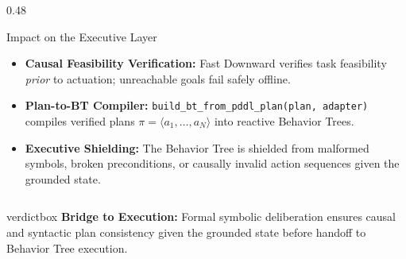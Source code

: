 \documentclass[10pt]{beamer}
\begin{document}
\begin{frame}[t]
\begin{columns}[T]
        \begin{column}{0.48\textwidth}
            \begin{block}{Impact on the Executive Layer}
                \begin{itemize}\scriptsize
                    \setlength\itemsep{0.22em}
                    \item \textbf{Causal Feasibility Verification:}
                    \newline Fast Downward verifies task feasibility \textit{prior} to actuation; unreachable goals fail safely offline.
                    \item \textbf{Plan-to-BT Compiler:}
                    \newline \texttt{build\_bt\_from\_pddl\_plan(plan, adapter)} compiles verified plans $\pi = \langle a_1, \dots, a_N \rangle$ into reactive Behavior Trees.
                    \item \textbf{Executive Shielding:}
                    \newline The Behavior Tree is shielded from malformed symbols, broken preconditions, or causally invalid action sequences given the grounded state.
                \end{itemize}
            \end{block}
        \end{column}
    \end{columns}

    \vspace{0.06cm}
    \begin{beamercolorbox}[sep=3pt,center,shadow=true,rounded=true]{verdictbox}
        \tiny \textbf{Bridge to Execution:} Formal symbolic deliberation ensures causal and syntactic plan consistency given the grounded state before handoff to Behavior Tree execution.
    \end{beamercolorbox}
\end{frame}
\end{document}
